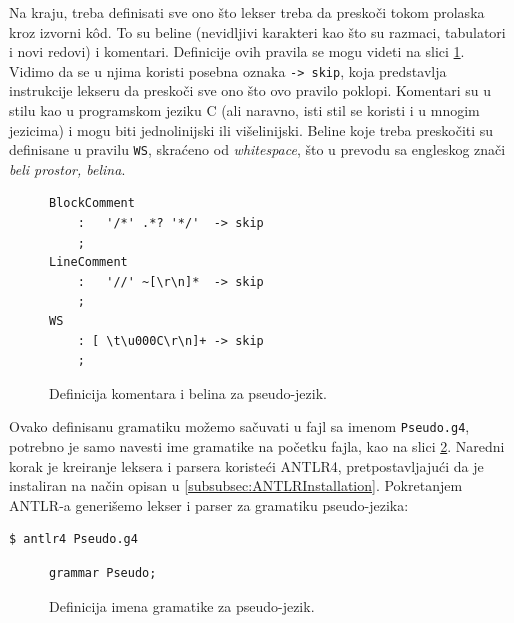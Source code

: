 Na kraju, treba definisati sve ono što lekser treba da preskoči tokom prolaska kroz izvorni k\^od. To su beline (nevidljivi karakteri kao što su razmaci, tabulatori i novi redovi) i komentari. Definicije ovih pravila se mogu videti na slici \ref{fig:PseudoDef8}. Vidimo da se u njima koristi posebna oznaka \texttt{-> skip}, koja predstavlja instrukcije lekseru da preskoči sve ono što ovo pravilo poklopi. Komentari su u stilu kao u programskom jeziku C (ali naravno, isti stil se koristi i u mnogim jezicima) i mogu biti jednolinijski ili višelinijski. Beline koje treba preskočiti su definisane u pravilu \texttt{WS}, skraćeno od \emph{whitespace}, što u prevodu sa engleskog znači \emph{beli prostor, belina}.

\begin{figure}[h!]
\begin{lstlisting}[language={}]
BlockComment
    :   '/*' .*? '*/'  -> skip
    ;
LineComment
    :   '//' ~[\r\n]*  -> skip
    ;
WS  
    : [ \t\u000C\r\n]+ -> skip
    ;
\end{lstlisting}
\caption{Definicija komentara i belina za pseudo-jezik.}
\label{fig:PseudoDef8}
\end{figure}

Ovako definisanu gramatiku možemo sačuvati u fajl sa imenom \texttt{Pseudo.g4}, potrebno je samo navesti ime gramatike na početku fajla, kao na slici \ref{fig:PseudoDef9}. Naredni korak je kreiranje leksera i parsera koristeći ANTLR4, pretpostavljajući da je instaliran na način opisan u \ref{subsubsec:ANTLRInstallation}. Pokretanjem ANTLR-a generišemo lekser i parser za gramatiku pseudo-jezika:
\begin{lstlisting}[language={}]
$ antlr4 Pseudo.g4
\end{lstlisting}

\begin{figure}[h!]
\begin{lstlisting}[language={}]
grammar Pseudo;
\end{lstlisting}
\caption{Definicija imena gramatike za pseudo-jezik.}
\label{fig:PseudoDef9}
\end{figure}

